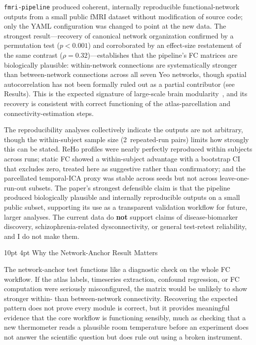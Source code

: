 \documentclass[12pt]{article}
\makeatletter
\renewcommand\subsection{%
  \@startsection{subsection}{2}{\z@}%
    {10pt \@plus 2pt \@minus 1pt}%
    {4pt}%
    {\normalfont\normalsize\bfseries}}
\makeatother
\begin{document}
\texttt{fmri-pipeline} produced coherent, internally reproducible
functional-network outputs from a small public fMRI dataset without
modification of source code; only the YAML configuration was changed
to point at the new data. The strongest result---recovery of canonical
network organization confirmed by a permutation test ($p < 0.001$) and
corroborated by an effect-size restatement of the same contrast
($\rho = 0.32$)---establishes that the pipeline's FC matrices are
biologically plausible: within-network connections are systematically
stronger than between-network connections across all seven Yeo
networks, though spatial autocorrelation has not been formally ruled
out as a partial contributor (see Results). This is the expected
signature of large-scale brain
modularity~\citep{bullmore2009complex}, and its recovery is consistent
with correct functioning of the atlas-parcellation and
connectivity-estimation steps.

The reproducibility analyses collectively indicate the outputs are not
arbitrary, though the within-subject sample size (2~repeated-run pairs)
limits how strongly this can be stated. ReHo profiles were nearly
perfectly reproduced within subjects across runs; static FC showed a
within-subject advantage with a bootstrap CI that excludes zero,
treated here as suggestive rather than confirmatory; and the
parcellated temporal-ICA proxy was stable across seeds but not across
leave-one-run-out subsets. The paper's strongest defensible claim is that
the pipeline produced biologically plausible and internally reproducible
outputs on a small public subset, supporting its use as a transparent
validation workflow for future, larger analyses. The current data do
\textbf{not} support claims of disease-biomarker discovery,
schizophrenia-related dysconnectivity, or general test-retest
reliability, and I do not make them.

\subsection{Why the Network-Anchor Result Matters}

The network-anchor test functions like a diagnostic check on the whole
FC workflow. If the atlas labels, timeseries extraction, confound
regression, or FC computation were seriously misconfigured, the matrix
would be unlikely to show stronger within- than between-network
connectivity. Recovering the expected pattern does not prove every
module is correct, but it provides meaningful evidence that the core
workflow is functioning sensibly, much as checking that a new
thermometer reads a plausible room temperature before an experiment does
not answer the scientific question but does rule out using a broken
instrument.
\end{document}
